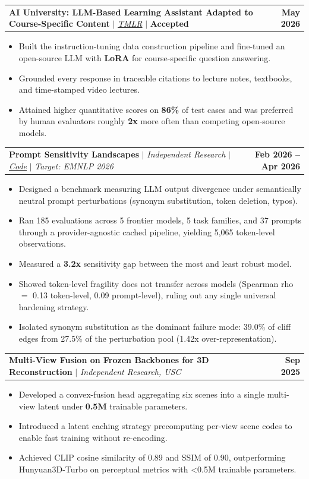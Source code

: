 \documentclass[letterpaper,10pt]{article}
\makeatletter
\newcommand{\resumeItem}[1]{\item{{#1 \vspace{-3pt}}}}
\newcommand{\titleItem}[1]{\textbf{#1}}
\newcommand{\resumeProjectHeading}[2]{
    \item
    \begin{tabular*}{0.97\textwidth}{l@{\extracolsep{\fill}}r}
      #1 & #2 \\
    \end{tabular*}\vspace{-8pt}
}
\newcommand{\resumeItemListStart}{\begin{itemize}}
\newcommand{\resumeItemListEnd}{\end{itemize}\vspace{-7pt}}
\makeatother
\begin{document}
    \resumeProjectHeading
      {\titleItem{AI University: LLM-Based Learning Assistant Adapted to Course-Specific Content} $|$ \emph{\href{https://openreview.net/forum?id=fOq0kufXLq}{TMLR}} $|$ \textbf{Accepted}}{\textbf{May 2026}}
      \resumeItemListStart
      \vspace{1mm}
        \resumeItem{Built the instruction-tuning data construction pipeline and fine-tuned an open-source LLM with \textbf{LoRA} for course-specific question answering.}
        \resumeItem{Grounded every response in traceable citations to lecture notes, textbooks, and time-stamped video lectures.}
        \resumeItem{Attained higher quantitative scores on \textbf{86\%} of test cases and was preferred by human evaluators roughly \textbf{2x} more often than competing open-source models.}
      \resumeItemListEnd

    \vspace{1mm}
    \resumeProjectHeading
      {\titleItem{Prompt Sensitivity Landscapes} $|$ \emph{Independent Research} $|$ \emph{\href{https://github.com/ManasVardhan/Prompt-Sensitivity-Landscapes}{Code}} $|$ \emph{Target: EMNLP 2026}}{\textbf{Feb 2026 -- Apr 2026}}
      \resumeItemListStart
      \vspace{1mm}
        \resumeItem{Designed a benchmark measuring LLM output divergence under semantically neutral prompt perturbations (synonym substitution, token deletion, typos).}
        \resumeItem{Ran 185 evaluations across 5 frontier models, 5 task families, and 37 prompts through a provider-agnostic cached pipeline, yielding 5,065 token-level observations.}
        \resumeItem{Measured a \textbf{3.2x} sensitivity gap between the most and least robust model.}
        \resumeItem{Showed token-level fragility does not transfer across models (Spearman rho $=$ 0.13 token-level, 0.09 prompt-level), ruling out any single universal hardening strategy.}
        \resumeItem{Isolated synonym substitution as the dominant failure mode: 39.0\% of cliff edges from 27.5\% of the perturbation pool (1.42x over-representation).}
      \resumeItemListEnd

    \vspace{1mm}
    \resumeProjectHeading
      {\titleItem{Multi-View Fusion on Frozen Backbones for 3D Reconstruction} $|$ \emph{Independent Research, USC} }{\textbf{Sep 2025}}
      \resumeItemListStart
      \vspace{1mm}
        \resumeItem{Developed a convex-fusion head aggregating six scenes into a single multi-view latent under \textbf{0.5M} trainable parameters.}
        \resumeItem{Introduced a latent caching strategy precomputing per-view scene codes to enable fast training without re-encoding.}
        \resumeItem{Achieved CLIP cosine similarity of 0.89 and SSIM of 0.90, outperforming Hunyuan3D-Turbo on perceptual metrics with <0.5M trainable parameters.}
      \resumeItemListEnd
\end{document}
